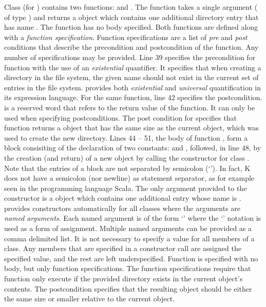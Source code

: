 Class  (for ) contains two functions:
 and . The  function takes a
single argument ( of type ) and returns a
 object which contains one additional directory entry that
has name . The  function has no body
specified. Both functions are defined along with a {\em function
  specification}. Function specifications are a list of {\em pre} and
{\em post} conditions that describe the precondition and postcondition
of the function. Any number of specifications may be provided. Line 39
specifies the precondition for function  with the use of
an {\em existential} quantifier. It specifies that when creating a
directory in the file system, the given name  should not exist
in the current set of entries in the file system. \Klang{} provides
both {\em existential} and {\em universal} quantification in its
expression language. For the same function, line 42 specifies the
postcondition.  is a reserved word that refers to the
return value of the function. It can only be used when specifying
postconditions. The post condition for  specifies that
function  returns a  object that has the same
size as the current  object, which was used to create the new
directory. Lines 44 -- 51, the body of function , 
form a block consisiting of the declaration of two constants:  
and , followed, in line 48, by the creation (and return) of
a new  object by calling the constructor for class
. 
Note that the entries of a block are not separated by 
semicolon (`\code{;}'). In fact, K does not have a semicolon (nor newline) 
as statement separator, as for example seen in the programming language
Scala. The only argument provided to the  constructor is a
 object which contains one additional  entry whose
name is . \Klang{} provides constructors automatically for all
classes where the arguments are {\em named arguments}. Each named
argument is of the form `' where the `\code{::}'
notation is used as a form of assignment. Multiple named arguments can
be provided as a comma delimited list. It is not necessary to specify
a value for all members of a class. Any members that are specified in
a constructor call are assigned the specified value, and the rest are
left underspecified.  
Function  is
specified with no body, but only function specifications. The function
specifications require that function  only execute if the
provided directory  exists in the current object's
contents. The postcondition specifies that the resulting 
object should be either the same size or smaller relative to the
current object.

